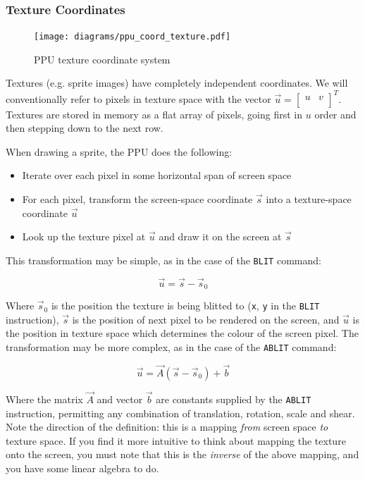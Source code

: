 \subsubsection*{Texture Coordinates}

\begin{figure}[H]
\centering
\caption{PPU texture coordinate system}
\label{diagram:ppu_coord_texture}
\texttt{[image: diagrams/ppu\_coord\_texture.pdf]}
\end{figure}

Textures (e.g. sprite images) have completely independent coordinates. We will conventionally refer to pixels in texture space with the vector $\vec{u} = \begin{bmatrix} u & v \\ \end{bmatrix}^T$. Textures are stored in memory as a flat array of pixels, going first in $u$ order and then stepping down to the next row.

When drawing a sprite, the PPU does the following:

\begin{itemize}
	\item Iterate over each pixel in some horizontal span of screen space
	\item For each pixel, transform the screen-space coordinate $\vec{s}$ into a texture-space coordinate $\vec{u}$
	\item Look up the texture pixel at $\vec{u}$ and draw it on the screen at $\vec{s}$
\end{itemize}

This transformation may be simple, as in the case of the {\tt BLIT} command:

\[
\vec{u} = \vec{s} - \vec{s}_0
\]

Where $\vec{s}_0$ is the position the texture is being blitted to ({\tt x}, {\tt y} in the {\tt BLIT} instruction), $\vec{s}$ is the position of next pixel to be rendered on the screen, and $\vec{u}$ is the position in texture space which determines the colour of the screen pixel. The transformation may be more complex, as in the case of the {\tt ABLIT} command:

\[
\vec{u} = \vec{A}(\vec{s} - \vec{s}_0) + \vec{b}
\]

Where the matrix $\vec{A}$ and vector $\vec{b}$ are constants supplied by the {\tt ABLIT} instruction, permitting any combination of translation, rotation, scale and shear. Note the direction of the definition: this is a mapping {\it from} screen space {\it to} texture space. If you find it more intuitive to think about mapping the texture onto the screen, you must note that this is the {\it inverse} of the above mapping, and you have some linear algebra to do.

